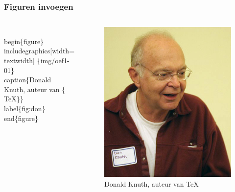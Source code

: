 \documentclass[aspectratio=169]{beamer}
\begin{document}
\begin{frame}[fragile]
  \frametitle{Figuren invoegen}

  \begin{columns}[c]
\begin{semiverbatim}
\alert<1>{\\begin\{figure\}}
  \alert<2>{\\includegraphics[width=\\textwidth]
    \{img/oef1-01\}}
  \alert<3>{\\caption\{Donald Knuth, auteur van
    \{\\TeX\}\}}
  \alert<4>{\\label\{fig:don\}}
\alert<1>{\\end\{figure\}}
\end{semiverbatim}

    \begin{figure}
      \includegraphics[width=\textwidth]{img/oef1-01}
      \caption{Donald Knuth, auteur van {\TeX}}
      \label{fig:don}
    \end{figure}

  \end{columns}

\end{frame}
\end{document}
